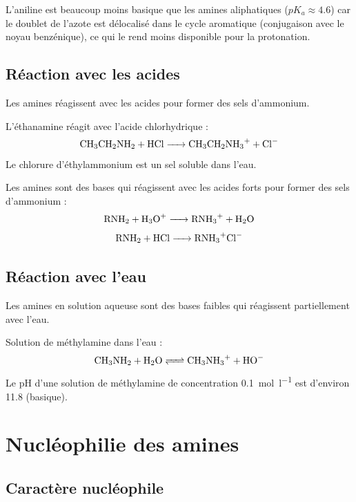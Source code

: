 \begin{remarque}
L'aniline  est beaucoup moins basique que les amines aliphatiques ($pK_a \approx \num{4.6}$) car le doublet de l'azote est délocalisé dans le cycle aromatique (conjugaison avec le noyau benzénique), ce qui le rend moins disponible pour la protonation.
\end{remarque}

\subsection{Réaction avec les acides}

Les amines réagissent avec les acides pour former des sels d'ammonium.

\begin{experience}
L'éthanamine  réagit avec l'acide chlorhydrique  :
\[\ce{CH3CH2NH2 + HCl -> CH3CH2NH3+ + Cl-}\]
Le chlorure d'éthylammonium  est un sel soluble dans l'eau.
\end{experience}

\begin{loi}
Les amines sont des bases qui réagissent avec les acides forts pour former des sels d'ammonium :
\[\ce{RNH2 + H3O+ -> RNH3+ + H2O}\]
\[\ce{RNH2 + HCl -> RNH3+Cl-}\]
\end{loi}

\subsection{Réaction avec l'eau}

Les amines en solution aqueuse sont des bases faibles qui réagissent partiellement avec l'eau.

\begin{exemple}
Solution de méthylamine dans l'eau :
\[\ce{CH3NH2 + H2O <=> CH3NH3+ + HO-}\]
Le pH d'une solution de méthylamine de concentration \SI{0.1}{\mol\per\litre} est d'environ \num{11.8} (basique).
\end{exemple}

\section{Nucléophilie des amines}

\subsection{Caractère nucléophile}

